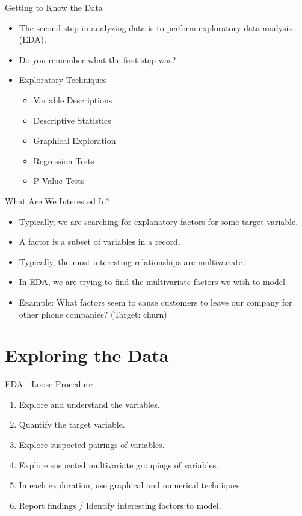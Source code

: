 \documentclass[handout]{beamer}
\begin{document}
\begin{frame}{Getting to Know the Data}
\begin{itemize}[<+->]
   \item The second step in analyzing data is to perform exploratory data analysis (EDA).
   \item Do you remember what the first step was?
   \item Exploratory Techniques
   \begin{itemize}
        \item Variable Descriptions
        \item Descriptive Statistics
        \item Graphical Exploration
        \item Regression Tests
        \item P-Value Tests
   \end{itemize}
\end{itemize}
\end{frame}

\begin{frame}{What Are We Interested In?}
\begin{itemize}[<+->]
    \item Typically, we are searching for explanatory factors for some target variable.
    \item A factor is a subset of variables in a record.
    \item Typically, the most interesting relationships are multivariate.
    \item In EDA, we are trying to find the multivariate factors we wish to model.
    \item Example: What factors seem to cause customers to leave our company for other
        phone companies? (Target: churn)
\end{itemize}
\end{frame}



\section{Exploring the Data}
\begin{frame}{EDA - Loose Procedure}
\begin{enumerate}[<+->]
    \item Explore and understand the variables.
    \item Quantify the target variable.
    \item Explore suspected pairings of variables.
    \item Explore suspected multivariate groupings of variables.
    \item In each exploration, use graphical and numerical techniques.
    \item Report findings / Identify interesting factors to model.
\end{enumerate}    
\end{frame}
\end{document}
